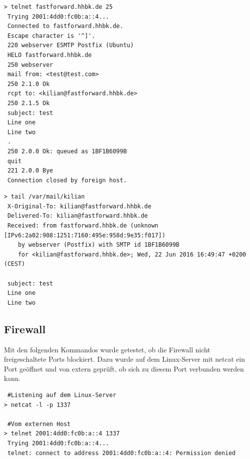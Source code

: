 \begin{lstlisting}[numbers=none]
> telnet fastforward.hhbk.de 25
 Trying 2001:4dd0:fc0b:a::4...
 Connected to fastforward.hhbk.de.
 Escape character is '^]'.
 220 webserver ESMTP Postfix (Ubuntu)
 HELO fastforward.hhbk.de
 250 webserver
 mail from: <test@test.com>
 250 2.1.0 Ok
 rcpt to: <kilian@fastforward.hhbk.de>
 250 2.1.5 Ok
 subject: test
 Line one
 Line two
 .
 250 2.0.0 Ok: queued as 1BF1B6099B
 quit
 221 2.0.0 Bye
 Connection closed by foreign host.
\end{lstlisting}

\begin{lstlisting}[numbers=none]
> tail /var/mail/kilian 
 X-Original-To: kilian@fastforward.hhbk.de
 Delivered-To: kilian@fastforward.hhbk.de
 Received: from fastforward.hhbk.de (unknown [IPv6:2a02:908:1251:7160:495e:958d:9e35:f017])
	by webserver (Postfix) with SMTP id 1BF1B6099B
	for <kilian@fastforward.hhbk.de>; Wed, 22 Jun 2016 16:49:47 +0200 (CEST)

 subject: test
 Line one
 Line two
\end{lstlisting}

\subsection{Firewall}

Mit den folgenden Kommandos wurde getestet, ob die Firewall nicht freigeschaltete Ports blockiert. Dazu wurde auf dem Linux-Server mit {\sc netcat} ein Port geöffnet und von extern geprüft, ob sich zu diesem Port verbunden werden kann.

\begin{lstlisting}
 #Listening auf dem Linux-Server
> netcat -l -p 1337

 #Vom externen Host
> telnet 2001:4dd0:fc0b:a::4 1337
 Trying 2001:4dd0:fc0b:a::4...
 telnet: connect to address 2001:4dd0:fc0b:a::4: Permission denied
\end{lstlisting}
